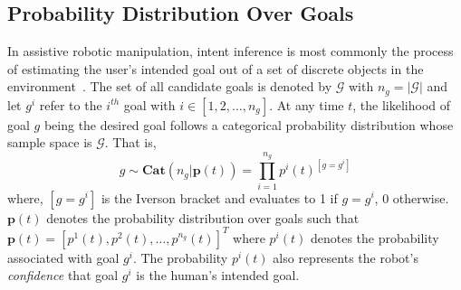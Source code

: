 \documentclass[conference]{IEEEtran}
\begin{document}
\subsection{Probability Distribution Over Goals}\label{ssec:notation}
 In assistive robotic manipulation, intent inference is most commonly the process of estimating the user's intended goal out of a set of discrete objects in the environment~\citep{calli2015ycb}. The set of all candidate goals is denoted by $\mathcal{G}$ with $n_g = \vert\mathcal{G}\vert$ and let $g^i$ refer to the $i^{th}$ goal with $i \in [1,2,\dots, n_g]$. At any time $t$, the likelihood of goal $g$ being the desired goal follows a categorical probability distribution whose sample space is $\mathcal{G}$. 
 That is, 
 \begin{equation*}
 g \sim \textbf{Cat}(n_g | \boldsymbol{p}(t)) = \prod_{i=1}^{n_g}p^{i}(t)^{[g = g^i]}
 \end{equation*}
where, $[g = g^i]$ is the Iverson bracket and evaluates to 1 if $g = g^i$, 0 otherwise. $\boldsymbol{p}(t)$ denotes the probability distribution over goals such that $\boldsymbol{p}(t) = [p^1(t), p^2(t),\dots, p^{n_g}(t)]^{T}$ where $p^i(t)$ denotes the probability associated with goal $g^i$.  The probability $p^i(t)$ also represents the robot's \textit{confidence} that goal $g^i$ is the human's intended goal. 
\end{document}
